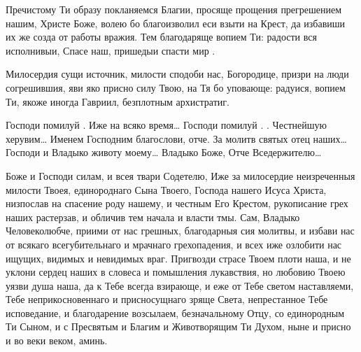 \begin{mymulticols}
 Пречистому Ти образу покланяемся Благии, просяще прощения прегрешением нашим, Христе Боже, волею бо благоизволил еси взыти на Крест, да избавиши их же созда от работы вражия. Тем благодаряще вопием Ти: радости вся исполнивыи, Спасе наш, пришедыи спасти мир . 

 Милосердия сущи источник, милости сподоби нас, Богородице, призри на люди согрешившия, яви яко присно силу Твою, на Тя бо уповающе: радуися, вопием Ти, якоже иногда Гавриил, безплотным архистратиг. 

Господи помилуй . Иже на всяко время… Господи помилуй . . Честнейшую херувим… Именем Господним благослови, отче. За молитв святых отец наших…  Господи и Владыко животу моему…  Владыко Боже, Отче Вседержителю… 

 Боже и Господи силам, и всея твари Содетелю, Иже за милосердие неизреченныя милости Твоея, единороднаго Сына Твоего, Господа нашего Исуса Христа, низпослав на спасение роду нашему, и честным Его Крестом, рукописание грех наших растерзав, и обличив тем начала и власти тмы. Сам, Владыко Человеколюбче, приими от нас грешных, благодарныя сия молитвы, и избави нас от всякаго всегубительнаго и мрачнаго грехопадения, и всех иже озлобити нас ищущих, видимых и невидимых враг. Пригвозди страсе Твоем плоти наша, и не уклони сердец наших в словеса и помышления лукавствия, но любовию Твоею уязви душа наша, да к Тебе всегда взирающе, и еже от Тебе светом наставляеми, Тебе неприкосновеннаго и присносущнаго зряще Света, непрестанное Тебе исповедание, и благодарение возсылаем, безначальному Отцу, со единородным Ти Сыном, и с Пресвятым и Благим и Животворящим Ти Духом, ныне и присно и во веки веком, аминь.


\end{mymulticols}

